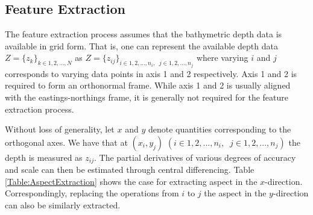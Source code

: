 %			
%			
			
			\FloatBarrier
	
		\subsection{Feature Extraction}
		\label{BenthicHabitatMapping:BathymetricFeatures:FeatureExtraction}
		
			The feature extraction process assumes that the bathymetric depth data is available in grid form. That is, one can represent the available depth data $Z = \{z_{k}\}_{k \in {1, 2, ..., N}}$ as $Z = \{z_{ij}\}_{i \in {1, 2, ..., n_{i}}, \;\; j \in {1, 2, ..., n_{j}}}$ where varying $i$ and $j$ corresponds to varying data points in axis 1 and 2 respectively. Axis 1 and 2 is required to form an orthonormal frame. While axis 1 and 2 is usually aligned with the eastings-northings frame, it is generally not required for the feature extraction process.
			
			Without loss of generality, let $x$ and $y$ denote quantities corresponding to the orthogonal axes. We have that at $(x_{i}, y_{j})$ $(i \in {1, 2, ..., n_{i}}, \;\; j \in {1, 2, ..., n_{j}})$ the depth is measured as $z_{ij}$. The partial derivatives of various degrees of accuracy and scale can then be estimated through central differencing. Table \ref{Table:AspectExtraction}  shows the case for extracting aspect in the $x$-direction. Correspondingly, replacing the operations from $i$ to $j$ the aspect in the $y$-direction can also be similarly extracted.
			
